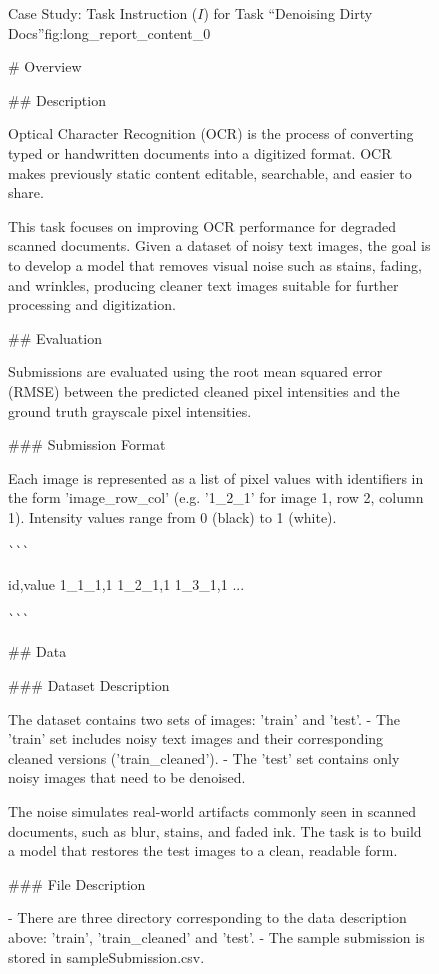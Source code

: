 \begin{figure}
    \centering

\begin{ReportFrame}{Case Study: Task Instruction ($I$) for Task ``Denoising Dirty Docs''}{fig:long_report_content_0}

\# Overview

\#\# Description

Optical Character Recognition (OCR) is the process of converting typed or handwritten documents into a digitized format. OCR makes previously static content editable, searchable, and easier to share.

This task focuses on improving OCR performance for degraded scanned documents. Given a dataset of noisy text images, the goal is to develop a model that removes visual noise such as stains, fading, and wrinkles, producing cleaner text images suitable for further processing and digitization.

\#\# Evaluation

Submissions are evaluated using the root mean squared error (RMSE) between the predicted cleaned pixel intensities and the ground truth grayscale pixel intensities.

\#\#\# Submission Format

Each image is represented as a list of pixel values with identifiers in the form 'image\_row\_col' (e.g. '1\_2\_1' for image 1, row 2, column 1). Intensity values range from 0 (black) to 1 (white).

\verb|```|

id,value
1\_1\_1,1
1\_2\_1,1
1\_3\_1,1
...

\verb|```|

\#\# Data

\#\#\# Dataset Description

The dataset contains two sets of images: 'train' and 'test'.  
- The 'train' set includes noisy text images and their corresponding cleaned versions ('train\_cleaned').
- The 'test' set contains only noisy images that need to be denoised.

The noise simulates real-world artifacts commonly seen in scanned documents, such as blur, stains, and faded ink. The task is to build a model that restores the test images to a clean, readable form.

\#\#\# File Description

- There are three directory corresponding to the data description above: 'train', 'train\_cleaned' and 'test'.
- The sample submission is stored in sampleSubmission.csv.
    
\end{ReportFrame}
    
\label{fig:task_instruction_denoising}

\end{figure}